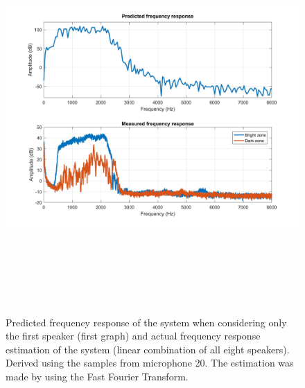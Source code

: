 \begin{figure}[H]
\centering
\includegraphics[width=15cm,height=15cm,keepaspectratio]{Figures/fftbacc}
\decoRule
\caption[Frequency response]{Predicted frequency response of the system when considering only the first speaker (first graph) and actual frequency response estimation of the system (linear combination of all eight speakers). Derived using the samples from microphone 20. The estimation was made by using the Fast Fourier Transform.}
\label{fig:fr_multiple}
\end{figure}


